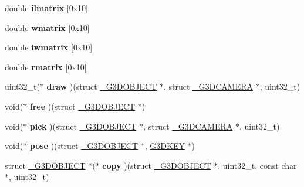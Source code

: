 \begin{DoxyCompactItemize}
double {\bfseries ilmatrix} \mbox{[}0x10\mbox{]}
\item 
\mbox{\label{struct__G3DOBJECT_aa9dde10e75aabb1efd49c57b7cd46de1}} 
double {\bfseries wmatrix} \mbox{[}0x10\mbox{]}
\item 
\mbox{\label{struct__G3DOBJECT_a1a5bd98a69648a3b9cf35db929354495}} 
double {\bfseries iwmatrix} \mbox{[}0x10\mbox{]}
\item 
\mbox{\label{struct__G3DOBJECT_a8255371167bfc1d88893f8dbb329b83c}} 
double {\bfseries rmatrix} \mbox{[}0x10\mbox{]}
\item 
\mbox{\label{struct__G3DOBJECT_af8cc258a43c32945854e6428d9d1144f}} 
uint32\+\_\+t($\ast$ {\bfseries draw} )(struct \hyperlink{struct__G3DOBJECT}{\+\_\+\+G3\+D\+O\+B\+J\+E\+CT} $\ast$, struct \hyperlink{struct__G3DCAMERA}{\+\_\+\+G3\+D\+C\+A\+M\+E\+RA} $\ast$, uint32\+\_\+t)
\item 
\mbox{\label{struct__G3DOBJECT_a34a950035675de0bf5b90073e2c06641}} 
void($\ast$ {\bfseries free} )(struct \hyperlink{struct__G3DOBJECT}{\+\_\+\+G3\+D\+O\+B\+J\+E\+CT} $\ast$)
\item 
\mbox{\label{struct__G3DOBJECT_a1a40c7eebb6cc21a02a1f646b7f4fcb1}} 
void($\ast$ {\bfseries pick} )(struct \hyperlink{struct__G3DOBJECT}{\+\_\+\+G3\+D\+O\+B\+J\+E\+CT} $\ast$, struct \hyperlink{struct__G3DCAMERA}{\+\_\+\+G3\+D\+C\+A\+M\+E\+RA} $\ast$, uint32\+\_\+t)
\item 
\mbox{\label{struct__G3DOBJECT_a5c9bf07fb383cbcea41ffee521523e51}} 
void($\ast$ {\bfseries pose} )(struct \hyperlink{struct__G3DOBJECT}{\+\_\+\+G3\+D\+O\+B\+J\+E\+CT} $\ast$, \hyperlink{struct__G3DKEY}{G3\+D\+K\+EY} $\ast$)
\item 
\mbox{\label{struct__G3DOBJECT_a5604450664884453ddfc2b92f6cf3902}} 
struct \hyperlink{struct__G3DOBJECT}{\+\_\+\+G3\+D\+O\+B\+J\+E\+CT} $\ast$($\ast$ {\bfseries copy} )(struct \hyperlink{struct__G3DOBJECT}{\+\_\+\+G3\+D\+O\+B\+J\+E\+CT} $\ast$, uint32\+\_\+t, const char $\ast$, uint32\+\_\+t)
\item 
\mbox{\label{struct__G3DOBJECT_ad91bb91159d937d658be0e98569bb7e8}} 

\end{DoxyCompactItemize}
